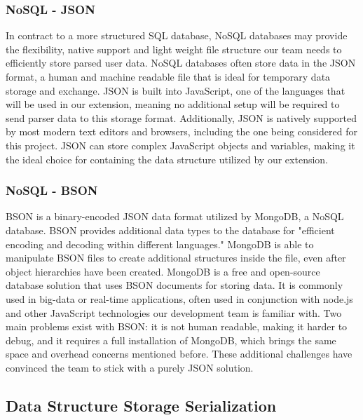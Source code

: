 \documentclass[letterpaper,10pt,titlepage,draftclsnofoot,onecolumn,onesided] {IEEEtran}
\begin{document}
\subsubsection{NoSQL - JSON}
In contract to a more structured SQL database, NoSQL databases may provide the flexibility, native support and light weight file structure our team needs to efficiently store parsed user data. 
NoSQL databases often store data in the JSON format, a human and machine readable file that is ideal for temporary data storage and exchange. 
JSON is built into JavaScript, one of the languages that will be used in our extension, meaning no additional setup will be required to send parser data to this storage format. 
Additionally, JSON is natively supported by most modern text editors and browsers, including the one being considered for this project. 
JSON can store complex JavaScript objects and variables, making it the ideal choice for containing the data structure utilized by our extension. \cite{bson}

\subsubsection{NoSQL - BSON}
BSON is a binary-encoded JSON data format utilized by MongoDB, a NoSQL database. 
BSON provides additional data types to the database for "efficient encoding and decoding within different languages." \cite{bson} MongoDB is able to manipulate BSON files to create additional structures inside the file, even after object hierarchies have been created. 
MongoDB is a free and open-source database solution that uses BSON documents for storing data. It is commonly used in big-data or real-time applications, often used in conjunction with node.js and other JavaScript technologies our development team is familiar with. 
Two main problems exist with BSON: it is not human readable, making it harder to debug, and it requires a full installation of MongoDB, which brings the same space and overhead concerns mentioned before. 
These additional challenges have convinced the team to stick with a purely JSON solution. \cite{mongo}

\subsection{Data Structure Storage Serialization}
\end{document}
